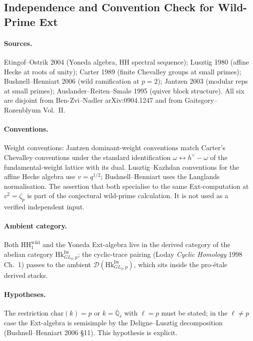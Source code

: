 \subsection{Independence and Convention Check for Wild-Prime Ext}

\paragraph{Sources.} Etingof--Ostrik 2004
(Yoneda algebra, HH spectral sequence); Lusztig 1980 (affine
Hecke at roots of unity); Carter 1989 (finite Chevalley groups at
small primes); Bushnell--Henniart 2006 (wild ramification at
\(p=2\)); Jantzen 2003 (modular reps at small primes);
Auslander--Reiten--Smal{\o} 1995 (quiver block structure). All six
are disjoint from Ben-Zvi--Nadler arXiv:0904.1247
and from Gaitsgory--Rozenblyum Vol.~II.

\paragraph{Conventions.} Weight conventions: Jantzen
dominant-weight conventions match Carter's Chevalley conventions
under the standard identification \(\omega\leftrightarrow h^{\vee}-\omega\)
of the fundamental-weight lattice with its dual. Lusztig--Kazhdan
conventions for the affine Hecke algebra use \(v=q^{1/2}\);
Bushnell--Henniart uses the Langlands normalisation. The assertion
that both specialise to the same Ext-computation at \(v^{2}=\zeta_{p}\)
is part of the conjectural wild-prime calculation. It is not used as a
verified independent input.

\paragraph{Ambient category.} Both
\(\mathrm{HH}_{1}^{\mathrm{wild}}\) and the Yoneda Ext-algebra live
in the derived category of the abelian category
\(\mathrm{Hk}^{\mathrm{Iw}}_{GL_{2},p}\); the cyclic-trace pairing
(Loday \emph{Cyclic Homology} 1998 Ch.~1) passes to the ambient
\(\mathcal{D}(\mathrm{Hk}^{\mathrm{Iw}}_{GL_{2},p})\), which sits
inside the pro-\'etale derived stacks.

\paragraph{Hypotheses.} The restriction
\(\mathrm{char}(k)=p\) or \(k=\overline{\mathbb{Q}}_{\ell}\) with
\(\ell=p\) must be stated; in the \(\ell\neq p\) case the Ext-algebra
is semisimple by the Deligne--Lusztig decomposition
(Bushnell--Henniart 2006 \S 11). This hypothesis is explicit.

